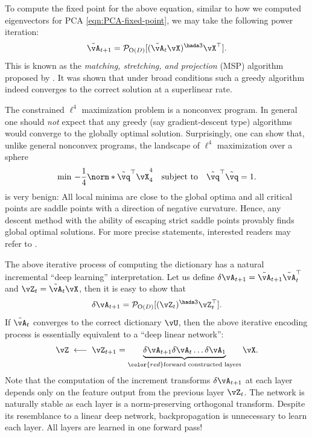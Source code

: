 \documentclass[../../book-main.tex]{subfiles}
\begin{document}
To compute the fixed point for the above equation, similar to how we computed
eigenvectors for PCA \eqref{eqn:PCA-fixed-point}, we may take the following
power iteration:
\begin{equation}\label{eq:msp_iteration}
    \tilde{\vA}_{t+1} = \mathcal{P}_{\mathrm O(D)}[( {\tilde{\vA}_t
    \vX})^{\hada 3}\vX^\top].
\end{equation}
This is known as the {\em matching, stretching, and projection} (MSP)
algorithm proposed by \cite{Zhai-2020}. It was shown that under broad
conditions such a greedy algorithm indeed converges to the correct
solution at a superlinear rate.

\begin{remark}\label{rem:L4-global}
    The constrained $\ell^4$ maximization problem is a nonconvex
    program. In general one should \textit{not} expect that any
    greedy (say gradient-descent type) algorithms would converge to
    the globally optimal solution. Surprisingly, one can show that,
    unlike general nonconvex programs, the landscape of $\ell^4$
    maximization over a sphere
    \begin{equation}\label{eq:l4-maximization-sphere}
        \min\,
        -   \frac{1}{4} \norm*{
            \tilde{\vq}^\top \vX
        }_4^4 \quad \mbox{subject to} \quad  \tilde{\vq}^\top\tilde{\vq} = 1.
    \end{equation}
    is very benign: All local minima are close to the global optima
    and all critical points are saddle points with a direction of
    negative curvature. Hence, any descent method with the ability of
    escaping strict saddle points provably finds global optimal
    solutions. For more precise statements, interested readers may
    refer to \cite{Qu2020Geometric}.
\end{remark}

\begin{remark}
    The above iterative process of computing the dictionary has a
    natural incremental ``deep learning'' interpretation. Let us define
    $\delta \vA_{t+1} = \tilde{\vA}_{t+1}\tilde{\vA}_{t}^\top$ and $\vZ_t
    = \tilde{\vA}_t \vX$, then it is easy to show that
    $$\delta \vA_{t+1} = \mathcal{P}_{\mathrm O(D)}[(\vZ_t)^{\hada 3}
    \vZ_t^\top].$$
    If $\tilde{\vA}_t$ converges to the correct dictionary $\vU$, then the
    above iterative encoding process is essentially equivalent to a
    ``deep linear network'':
    $$\vZ \; \longleftarrow \; \vZ_{t+1} =  \underbrace{\delta
    \vA_{t+1} \delta \vA_{t} \ldots \delta \vA_{1}}_{\color{red}
    \text{forward constructed layers}} \vX.$$
    Note that the computation of the increment transforms $\delta
    \vA_{t+1}$ at each layer depends only on the feature output from
    the previous layer $\vZ_t$. The network is naturally stable as
    each layer is a norm-preserving orthogonal transform. Despite its
    resemblance to a linear deep network, backpropagation is
    unnecessary to learn each layer. All layers are learned in one forward pass!
\end{remark}
\end{document}
